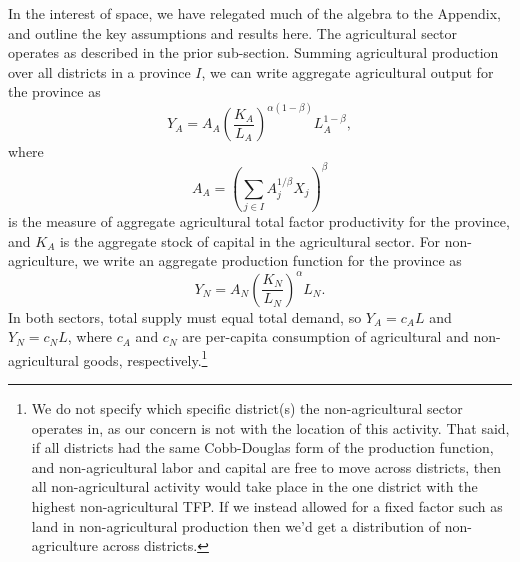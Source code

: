 \documentclass[11pt]{article}
\begin{document}
In the interest of space, we have relegated much of the algebra to the Appendix, and outline the key assumptions and results here. The agricultural sector operates as described in the prior sub-section. Summing agricultural production over all districts in a province $I$, we can write aggregate agricultural output for the province as
\begin{equation}
    Y_A = A_A \left(\frac{K_A}{L_A}\right)^{\alpha(1-\beta)} L_A^{1-\beta}, \label{EQ_caL_solve}
\end{equation}
where 
\begin{equation}
    A_A = \left(\sum_{j\in I} A_{j}^{1/\beta}X_{j} \right)^\beta \nonumber
\end{equation}
is the measure of aggregate agricultural total factor productivity for the province, and $K_A$ is the aggregate stock of capital in the agricultural sector. For non-agriculture, we write an aggregate production function for the province as
\begin{equation}
    Y_N = A_N \left(\frac{K_N}{L_N}\right)^{\alpha} L_N. \label{EQ_YN}
\end{equation}
In both sectors, total supply must equal total demand, so $Y_A = c_A L$ and $Y_N = c_N L$, where $c_A$ and $c_N$ are per-capita consumption of agricultural and non-agricultural goods, respectively.\footnote{We do not specify which specific district(s) the non-agricultural sector operates in, as our concern is not with the location of this activity. That said, if all districts had the same Cobb-Douglas form of the production function, and non-agricultural labor and capital are free to move across districts, then all non-agricultural activity would take place in the one district with the highest non-agricultural TFP. If we instead allowed for a fixed factor such as land in non-agricultural production then we'd get a distribution of non-agriculture across districts.}
\end{document}
